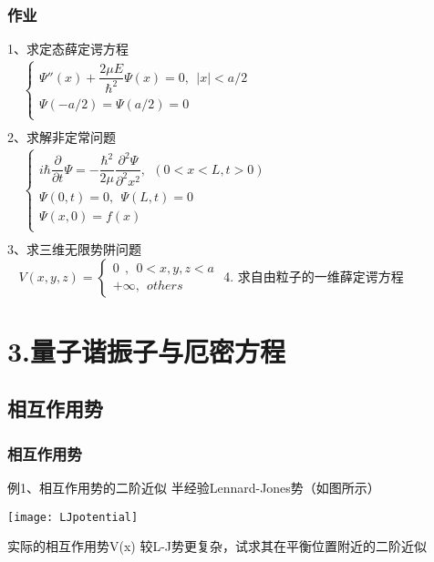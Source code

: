 \begin{frame}
	\frametitle{作业}
	1、求定态薛定谔方程\\ 
	$\begin{array}{lllllllll}
		& \begin{cases}
			\Psi'' (x) +\dfrac{2\mu E}{\hbar ^2} \Psi(x) =0,~~ |x|<a/2 \\
			\Psi(-a/2) =\Psi(a/2) =0\\
		\end{cases}\\	
	\end{array}$ \\ 
	2、求解非定常问题\\
	$\begin{array}{lllllllll}
		& \begin{cases}
			i\hbar \dfrac{\partial }{\partial t} \Psi = -\dfrac{\hbar^2}{2\mu } \dfrac{\partial ^2 \Psi }{\partial ^2  x ^2 } , ~~ (0<x<L, t>0) \\
			\Psi (0,t) =0, ~~ \Psi (L,t) =0 \\
			\Psi (x,0) =f(x)  \\
		\end{cases}\\
	\end{array}$ \\ 
	3、求三维无限势阱问题\\
	$ ~~~~	V(x,y,z)=\left \{ 
	\begin{array}{cccc}
		0	~~ ,~~ 0<x,y,z<a \\  
		+\infty ,~~others\
	\end{array}
	\right. $ 	
	4. 求自由粒子的一维薛定谔方程\\
\end{frame}

\section{3.量子谐振子与厄密方程}

\subsection{相互作用势}

\begin{frame}
	\frametitle{相互作用势}
	\begin{exampleblock} {例1、相互作用势的二阶近似}
		半经验Lennard-Jones势（如图所示）\\ \vspace{0.6em }
	   \centerline{\texttt{[image: LJpotential]}}  
		实际的相互作用势V(x) 较L-J势更复杂，试求其在平衡位置附近的二阶近似	
	\end{exampleblock}
\end{frame}

